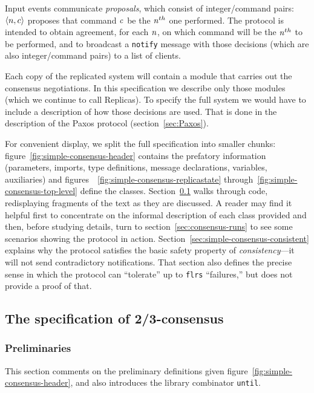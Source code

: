 \documentclass[final]{article}
\begin{document}
Input events communicate \emph{proposals}, which consist of
integer/command pairs: $\langle n,c\rangle$ proposes that command
$\mathit{c}$ be the $\mathit{n}^{th}$ one performed.  The protocol is
intended to obtain agreement, for each $\mathit{n}$, on which command
will be the $\mathit{n}^{th}$ to be performed, and to broadcast a
\lstinline{notify} message with those decisions (which are also
integer/command pairs) to a list of clients.

Each copy of the replicated system will contain a module that carries
out the consensus negotiations.  In this specification we describe
only those modules (which we continue to call Replicas).  To specify
the full system we would have to include a description of how those
decisions are used.  That is done in the description of the Paxos
protocol (section~\ref{sec:Paxos}).

For convenient display, we split the full specification into smaller
chunks: figure~\ref{fig:simple-consensus-header} contains the
prefatory information (parameters, imports, type definitions, message
declarations, variables, auxiliaries) and
figures~~\ref{fig:simple-consensus-replicastate}
through~\ref{fig:simple-consensus-top-level} define the classes.
Section~\ref{sec:simple-consensus-code} walks through code,
redisplaying fragments of the text as they are discussed.  A reader
may find it helpful first to concentrate on the informal description
of each class provided and then, before studying details, turn to
section~\ref{sec:consensus-runs} to see some scenarios showing the
protocol in action.  Section~\ref{sec:simple-consensus-consistent}
explains why the protocol satisfies the basic safety property of
\emph{consistency}---it will not send contradictory notifications.
That section also defines the precise sense in which the protocol can
``tolerate'' up to \lstinline{flrs} ``failures,'' but does not provide
a proof of that.

\subsection{The specification of 2/3-consensus}\label{sec:simple-consensus-code}

\subsubsection{Preliminaries}

This section comments on the preliminary definitions given
figure~\ref{fig:simple-consensus-header}, and also introduces the
library combinator \lstinline{until}.
\end{document}
